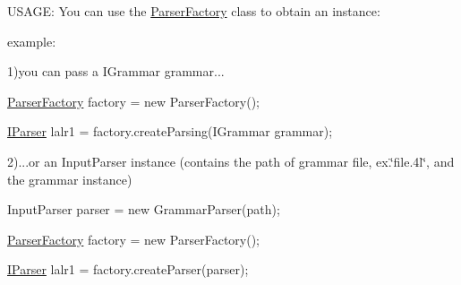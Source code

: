 U\-S\-A\-G\-E\-: You can use the \hyperlink{classcontext_free_1_1parser_1_1_parser_factory}{Parser\-Factory} class to obtain an instance\-:\par
 example\-:\par
 1)you can pass a I\-Grammar grammar...\par
 \hyperlink{classcontext_free_1_1parser_1_1_parser_factory}{Parser\-Factory} factory = new Parser\-Factory();\par
 \hyperlink{interfacecontext_free_1_1parser_1_1_i_parser}{I\-Parser} lalr1 = factory.\-create\-Parsing(\-I\-Grammar grammar);\par
 \par
 2)...or an Input\-Parser instance (contains the path of grammar file, ex.\char`\"{}file.\-4l\char`\"{}, and the grammar instance)\par


Input\-Parser parser = new Grammar\-Parser(path);\par
 \hyperlink{classcontext_free_1_1parser_1_1_parser_factory}{Parser\-Factory} factory = new Parser\-Factory();\par
 \hyperlink{interfacecontext_free_1_1parser_1_1_i_parser}{I\-Parser} lalr1 = factory.\-create\-Parser(parser);\par
 